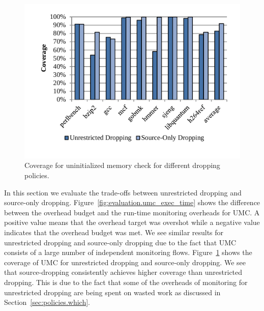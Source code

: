\begin{figure}
  \begin{center}
    \includegraphics[width=\columnwidth]{figs/data_umc_coverage.pdf}
    \vspace{-0.2in}
    \caption{Coverage for uninitialized memory check for different dropping policies.}
    \label{fig:evaluation.umc_coverage}
    \vspace{-0.1in}
  \end{center}
\end{figure}
In this section we evaluate the trade-offs between unrestricted dropping and source-only dropping.
Figure~\ref{fig:evaluation.umc_exec_time} shows the difference between the
overhead budget and the run-time monitoring overheads for UMC. A positive value
means that the overhead target was overshot while a negative value indicates
that the overhead budget was met. We see similar results for unrestricted
dropping and source-only dropping due to the fact that UMC consists of a large
number of independent monitoring flows.
Figure~\ref{fig:evaluation.umc_coverage} shows the coverage of UMC for
unrestricted dropping and source-only dropping. We see that source-dropping
consistently achieves higher coverage than unrestricted dropping. This is due
to the fact that some of the overheads of monitoring for unrestricted dropping
are being spent on wasted work as discussed in Section~\ref{sec:policies.which}.

